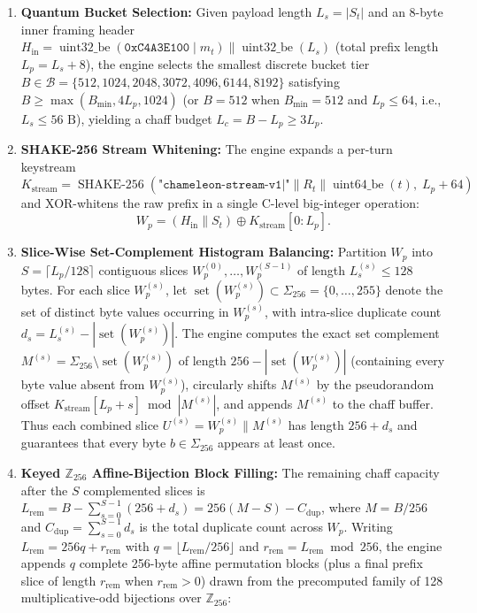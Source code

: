 \documentclass[conference,10pt]{IEEEtran}
\begin{document}
\begin{enumerate}
    \item \textbf{Quantum Bucket Selection:} Given payload length $L_s = |S_t|$ and an 8-byte inner framing header $H_{\text{in}} = \operatorname{uint32\_be}(\mathtt{0xC4A3E100} \mid m_t) \parallel \operatorname{uint32\_be}(L_s)$ (total prefix length $L_p = L_s + 8$), the engine selects the smallest discrete bucket tier $B \in \mathcal{B} = \{512, 1024, 2048, 3072, 4096, 6144, 8192\}$ satisfying $B \ge \max(B_{\min}, 4 L_p, 1024)$ (or $B = 512$ when $B_{\min}=512$ and $L_p \le 64$, i.e., $L_s \le 56\text{ B}$), yielding a chaff budget $L_c = B - L_p \ge 3 L_p$.
    \item \textbf{SHAKE-256 Stream Whitening:} The engine expands a per-turn keystream $K_{\text{stream}} = \operatorname{SHAKE-256}(\texttt{"chameleon-stream-v1|"} \parallel R_t \parallel \operatorname{uint64\_be}(t),\; L_p + 64)$ and XOR-whitens the raw prefix in a single C-level big-integer operation:
    \begin{equation}
    \label{eq:whiten}
    W_p = (H_{\text{in}} \parallel S_t) \oplus K_{\text{stream}}[0 : L_p].
    \end{equation}
    \item \textbf{Slice-Wise Set-Complement Histogram Balancing:} Partition $W_p$ into $S = \lceil L_p / 128 \rceil$ contiguous slices $W_p^{(0)}, \dots, W_p^{(S-1)}$ of length $L_s^{(s)} \le 128$ bytes. For each slice $W_p^{(s)}$, let $\operatorname{set}(W_p^{(s)}) \subset \Sigma_{256} = \{0,\dots,255\}$ denote the set of distinct byte values occurring in $W_p^{(s)}$, with intra-slice duplicate count $d_s = L_s^{(s)} - |\operatorname{set}(W_p^{(s)})|$. The engine computes the exact set complement $M^{(s)} = \Sigma_{256} \setminus \operatorname{set}(W_p^{(s)})$ of length $256 - |\operatorname{set}(W_p^{(s)})|$ (containing every byte value absent from $W_p^{(s)}$), circularly shifts $M^{(s)}$ by the pseudorandom offset $K_{\text{stream}}[L_p + s] \bmod |M^{(s)}|$, and appends $M^{(s)}$ to the chaff buffer. Thus each combined slice $U^{(s)} = W_p^{(s)} \parallel M^{(s)}$ has length $256 + d_s$ and guarantees that every byte $b \in \Sigma_{256}$ appears at least once.
    \item \textbf{Keyed $\mathbb{Z}_{256}$ Affine-Bijection Block Filling:} The remaining chaff capacity after the $S$ complemented slices is $L_{\text{rem}} = B - \sum_{s=0}^{S-1} (256 + d_s) = 256(M - S) - C_{\text{dup}}$, where $M = B / 256$ and $C_{\text{dup}} = \sum_{s=0}^{S-1} d_s$ is the total duplicate count across $W_p$. Writing $L_{\text{rem}} = 256 q + r_{\text{rem}}$ with $q = \lfloor L_{\text{rem}} / 256 \rfloor$ and $r_{\text{rem}} = L_{\text{rem}} \bmod 256$, the engine appends $q$ complete 256-byte affine permutation blocks (plus a final prefix slice of length $r_{\text{rem}}$ when $r_{\text{rem}} > 0$) drawn from the precomputed family of 128 multiplicative-odd bijections over $\mathbb{Z}_{256}$:

\end{enumerate}
\end{document}
